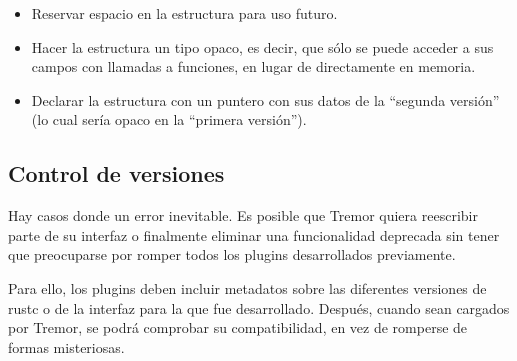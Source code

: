 \begin{itemize}
    \item Reservar espacio en la estructura para uso futuro.

    \item Hacer la estructura un tipo opaco, es decir, que sólo se puede acceder
        a sus campos con llamadas a funciones, en lugar de directamente en
        memoria.

    \item Declarar la estructura con un puntero con sus datos de la ``segunda
        versión'' (lo cual sería opaco en la ``primera versión'').

\end{itemize}

\subsection{Control de versiones}

Hay casos donde un error inevitable. Es posible que Tremor quiera reescribir
parte de su interfaz o finalmente eliminar una funcionalidad deprecada sin tener
que preocuparse por romper todos los plugins desarrollados previamente.

Para ello, los plugins deben incluir metadatos sobre las diferentes versiones de
rustc o de la interfaz para la que fue desarrollado. Después, cuando sean
cargados por Tremor, se podrá comprobar su compatibilidad, en vez de romperse de
formas misteriosas.

